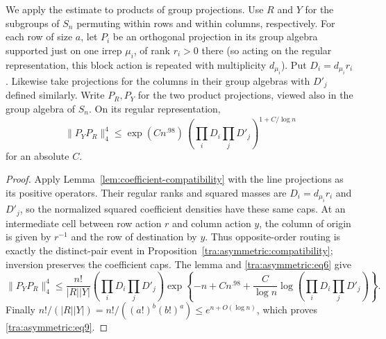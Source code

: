 \begin{corollary}\label{tra:asymmetric:projection-crossing}
\label{tra:asymmetric:projection-crossing-statement}
We apply the estimate to products of group projections. Use \(R\) and \(Y\) for the subgroups of \(S_n\) permuting within rows and within columns, respectively. For each row of size \(a\), let \(P_i\) be an orthogonal projection in its group algebra supported just on one irrep \(\mu_i\), of rank \(r_i>0\) there (so acting on the regular representation, this block action is repeated with multiplicity \(d_{\mu_i}\)). Put \(D_i=d_{\mu_i}r_i\). Likewise take projections for the columns in their group algebras with \(D'_j\) defined similarly. Write \(P_R,P_Y\) for the two product projections, viewed also in the group algebra of \(S_n\). On its regular representation,
\begin{equation}
           \|P_Y P_R\|_4^4
                  \le \exp(C n^{.98})\,
                         \left(\prod_i D_i \prod_j D'_j\right)^{1+C/\log n}
                        \label{tra:asymmetric:eq9}
\end{equation}
for an absolute \(C\).
\end{corollary}
\begin{proof}\label{tra:asymmetric:projection-crossing-proof}
\label{tra:asymmetric:projection-crossing-proof-details}
Apply Lemma~\ref{lem:coefficient-compatibility} with the line
projections as its positive operators. Their regular ranks and squared
masses are $D_i=d_{\mu_i}r_i$ and $D'_j$, so the normalized squared
coefficient densities have these same caps. At an intermediate cell
between row action $r$ and column action $y$, the column of origin is
given by $r^{-1}$ and the row of destination by $y$. Thus opposite-order
routing is exactly the distinct-pair event in
Proposition~\ref{tra:asymmetric:compatibility}; inversion preserves
the coefficient caps. The lemma and \eqref{tra:asymmetric:eq6} give
\[
 \|P_YP_R\|_4^4
 \le\frac{n!}{|R||Y|}
       \left(\prod_iD_i\prod_jD'_j\right)
       \exp\left\{-n+Cn^{.98}
          +\frac{C}{\log n}\log\left(\prod_iD_i\prod_jD'_j\right)\right\}.
\]
Finally $n!/(|R||Y|)=n!/((a!)^b(b!)^a)\le e^{n+O(\log n)}$,
which proves \eqref{tra:asymmetric:eq9}.
\end{proof}
